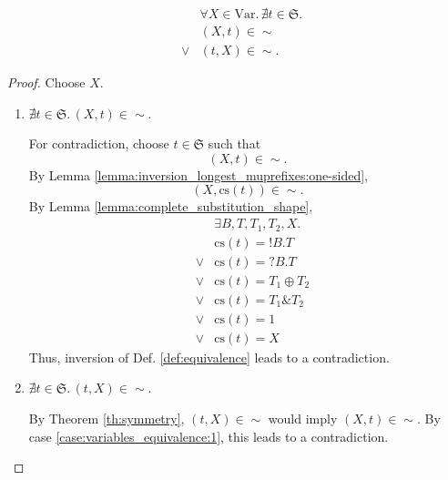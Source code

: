 \documentclass{llncs}
\newcommand*{\Var}{\mathrm{Var}}
\newcommand*{\Sy}{\mathfrak{S}}
\newcommand*{\cs}{\mathrm{cs}}
\newcommand*{\sequiv}{\sim}
\newcommand*{\send}{\mathord{!}}
\newcommand*{\recv}{\mathord{?}}
\newcommand*{\echoice}{\oplus}
\newcommand*{\ichoice}{\mathop{\&}}
\renewcommand*{\|}{\;|\;}
\begin{document}
\begin{lemma}[Variables in $\sequiv$]
  \label{lemma:variables_equivalence}
  \begin{eqnarray*}
    &&     \forall X \in \Var.\, \nexists t \in \Sy. \\
    &&     (X, t) \in \sequiv \\
    &\lor& (t, X) \in \sequiv.
  \end{eqnarray*}
\end{lemma}

\begin{proof}
  Choose $X$.

  \begin{enumerate}
    \item
      \label{case:variables_equivalence:1}
      $\nexists t \in \Sy.\, (X, t) \in \sequiv$.

      For contradiction, choose $t \in \Sy$ such that
      \begin{equation*}
        (X, t) \in \sequiv.
      \end{equation*}
      By Lemma \ref{lemma:inversion_longest_muprefixes:one-sided},
      \begin{equation*}
        (X, \cs(t)) \in \sequiv.
      \end{equation*}
      By Lemma \ref{lemma:complete_substitution_shape},
      \begin{eqnarray*}
        &&     \exists B, T, T_1, T_2, X. \\
        &&     \cs(t) = \send B.T \\
        &\lor& \cs(t) = \recv B.T \\
        &\lor& \cs(t) = T_1 \echoice T_2 \\
        &\lor& \cs(t) = T_1 \ichoice T_2 \\
        &\lor& \cs(t) = 1 \\
        &\lor& \cs(t) = X
      \end{eqnarray*}
      Thus, inversion of Def. \ref{def:equivalence} leads to a contradiction.

    \item
      \label{case:variables_equivalence:2}
      $\nexists t \in \Sy.\, (t, X) \in \sequiv$.

      By Theorem \ref{th:symmetry}, $(t, X) \in \sequiv$ would imply
      $(X, t) \in \sequiv$. By case \ref{case:variables_equivalence:1}, this
      leads to a contradiction.
  \end{enumerate}
\end{proof}
\end{document}
